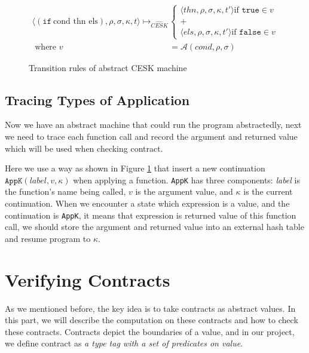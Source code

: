 \documentclass[paper=a4, fontsize=11pt]{scrartcl} %
\numberwithin{equation}{section} %
\numberwithin{figure}{section} %
\numberwithin{table}{section} %
\begin{document}
\begin{figure}[h!]
\begin{align*}
\langle (\texttt{if}~\text{cond thn els}), \rho, \sigma, \kappa, t \rangle \longmapsto_{\widehat{CESK}} &
\begin{cases}
\langle thn, \rho, \sigma, \kappa, t' \rangle \text{if } \texttt{true} \in v \\
+ \\
\langle els, \rho, \sigma, \kappa, t' \rangle \text{if } \texttt{false} \in v
\end{cases} \\
\text{ where } v & = \mathcal{A}(cond, \rho, \sigma)
\end{align*}
\caption{Transition rules of abstract CESK machine}
\label{fig:transabs}
\end{figure}

\subsection{Tracing Types of Application}

Now we have an abstract machine that could run the program abstractedly, next we need to trace each function call and record the argument and returned value which will be used when checking contract. 

Here we use a way as shown in Figure \ref{fig:transabs} that insert a new continuation $\texttt{AppK}(label, v, \kappa)$ when applying a function. \texttt{AppK} has three components: \textit{label} is the function's name being called, $v$ is the argument value, and $\kappa$ is the current continuation. When we encounter a state which expression is a value, and the continuation is \texttt{AppK}, it means that expression is returned value of this function call, we should store the argument and returned value into an external hash table and resume program to $\kappa$.


\section{Verifying Contracts}

As we mentioned before, the key idea is to take contracts as abstract values. In this part, we will describe the computation on these contracts and how to check these contracts. Contracts depict the boundaries of a value, and in our project, we define contract as \textit{a type tag with a set of predicates on value}.
\end{document}
